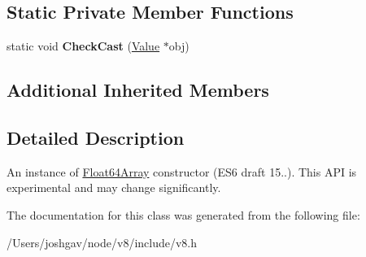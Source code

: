 \subsection*{Static Private Member Functions}
\begin{DoxyCompactItemize}
\item 
static void {\bfseries Check\+Cast} (\hyperlink{classv8_1_1_value}{Value} $\ast$obj)\hypertarget{classv8_1_1_float64_array_af351dcd287535555bca435b201ef60be}{}\label{classv8_1_1_float64_array_af351dcd287535555bca435b201ef60be}

\end{DoxyCompactItemize}
\subsection*{Additional Inherited Members}


\subsection{Detailed Description}
An instance of \hyperlink{classv8_1_1_float64_array}{Float64\+Array} constructor (E\+S6 draft 15..). This A\+PI is experimental and may change significantly. 

The documentation for this class was generated from the following file\+:\begin{DoxyCompactItemize}
\item 
/\+Users/joshgav/node/v8/include/v8.\+h\end{DoxyCompactItemize}
